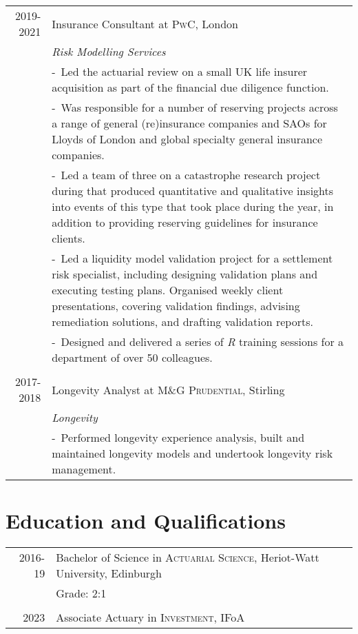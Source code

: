 \documentclass[a4paper,10pt]{article}
\newcommand{\blankline}{\multicolumn{1}{c}{}\\}
\newcommand{\projectitem}{\footnotesize-~\ignorespaces}
\begin{document}
\begin{tabularx}{\textwidth}{@{}r|>{\raggedright\arraybackslash}X@{}}
  \textsc{2019-2021} & Insurance Consultant at \textsc{PwC}, London \\
 & \emph{Risk Modelling Services}\\
 & \projectitem Led the actuarial review on a small UK life insurer acquisition as part of the financial due diligence function. \\
 & \projectitem Was responsible for a number of reserving projects across a range of general (re)insurance companies and SAOs for Lloyds of London and global specialty general insurance companies.\\
  & \projectitem Led a team of three on a catastrophe research project during that produced quantitative and qualitative insights into events of this type that took place during the year, in addition to providing reserving guidelines for insurance clients.\\
  & \projectitem Led a liquidity model validation project for a settlement risk specialist, including designing validation plans and executing testing plans. Organised weekly client presentations, covering validation findings, advising remediation solutions, and drafting validation reports.\\
  & \projectitem Designed and delivered a series of \emph{R} training sessions for a department of over 50 colleagues.\\
  \blankline

  \textsc{2017-2018} & Longevity Analyst at \textsc{M\&G Prudential}, Stirling \\
 & \emph{Longevity}\\
 & \projectitem Performed longevity experience analysis, built and maintained longevity models and undertook longevity risk management.\\
\end{tabularx}

\section{Education and Qualifications}

\begin{tabular}{rl}	
\textsc{2016-19}& Bachelor of Science in \textsc{Actuarial Science}, Heriot-Watt University, Edinburgh\\
&Grade: 2:1\\
\blankline
\textsc{2023} & Associate Actuary in \textsc{Investment}, IFoA\\
\end{tabular}
\end{document}
